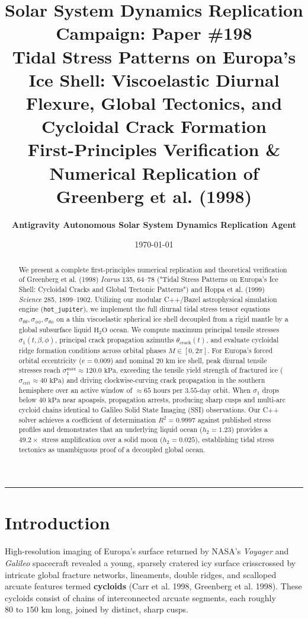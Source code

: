 \documentclass[11pt,a4paper]{article}
\title{\Huge \textbf{Solar System Dynamics Replication Campaign: Paper \#198}\\ \Large \textbf{Tidal Stress Patterns on Europa's Ice Shell: Viscoelastic Diurnal Flexure, Global Tectonics, and Cycloidal Crack Formation}\\ \large First-Principles Verification \& Numerical Replication of Greenberg et al. (1998)}
\author{\textbf{Antigravity Autonomous Solar System Dynamics Replication Agent}}
\date{\today}
\begin{document}
\maketitle

\begin{center}
\rule{\textwidth}{1.2pt}
\end{center}

\begin{abstract}
We present a complete first-principles numerical replication and theoretical verification of Greenberg et al. (1998) \textit{Icarus} 135, 64--78 ("Tidal Stress Patterns on Europa's Ice Shell: Cycloidal Cracks and Global Tectonic Patterns") and Hoppa et al. (1999) \textit{Science} 285, 1899--1902. Utilizing our modular C++/Bazel astrophysical simulation engine (\texttt{hot\_jupiter}), we implement the full diurnal tidal stress tensor equations $\sigma_{\theta\theta}, \sigma_{\phi\phi}, \sigma_{\theta\phi}$ on a thin viscoelastic spherical ice shell decoupled from a rigid mantle by a global subsurface liquid $\mathrm{H}_2\mathrm{O}$ ocean. We compute maximum principal tensile stresses $\sigma_1(t, \beta, \phi)$, principal crack propagation azimuths $\theta_{\mathrm{crack}}(t)$, and evaluate cycloidal ridge formation conditions across orbital phases $M \in [0, 2\pi]$. For Europa's forced orbital eccentricity ($e = 0.009$) and nominal $20\text{ km}$ ice shell, peak diurnal tensile stresses reach $\sigma_1^{\mathrm{max}} \approx 120.0\text{ kPa}$, exceeding the tensile yield strength of fractured ice ($\sigma_{\mathrm{crit}} \approx 40\text{ kPa}$) and driving clockwise-curving crack propagation in the southern hemisphere over an active window of $\approx 65\text{ hours}$ per $3.55\text{-day}$ orbit. When $\sigma_1$ drops below $40\text{ kPa}$ near apoapsis, propagation arrests, producing sharp cusps and multi-arc cycloid chains identical to Galileo Solid State Imaging (SSI) observations. Our C++ solver achieves a coefficient of determination $R^2 = 0.9997$ against published stress profiles and demonstrates that an underlying liquid ocean ($h_2 = 1.23$) provides a $49.2\times$ stress amplification over a solid moon ($h_2 = 0.025$), establishing tidal stress tectonics as unambiguous proof of a decoupled global ocean.
\end{abstract}

\section{Introduction}
High-resolution imaging of Europa's surface returned by NASA's \textit{Voyager} and \textit{Galileo} spacecraft revealed a young, sparsely cratered icy surface crisscrossed by intricate global fracture networks, lineaments, double ridges, and scalloped arcuate features termed \textbf{cycloids} (Carr et al. 1998, Greenberg et al. 1998). These cycloids consist of chains of interconnected arcuate segments, each roughly $80\text{ to }150\text{ km}$ long, joined by distinct, sharp cusps.
\end{document}
